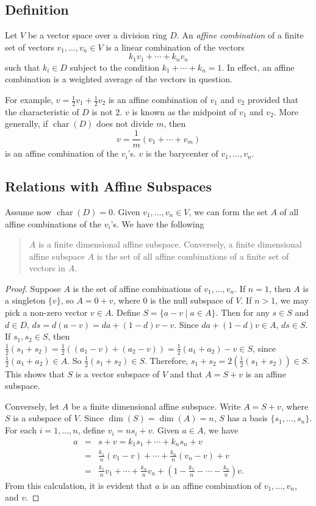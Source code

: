 \documentclass[12pt]{article}
\begin{document}
\subsection*{Definition}
Let $V$ be a vector space over a division ring $D$.  An \emph{affine combination} of a finite set of vectors $v_1,\ldots,v_n\in V$ is a linear combination of the vectors $$k_1v_1+\cdots+k_nv_n$$ such that $k_i\in D$ subject to the condition $k_1+\cdots+k_n=1$.  In effect, an affine combination is a weighted average of the vectors in question.

For example, $v=\frac{1}{2}v_1+\frac{1}{2}v_2$ is an affine combination of $v_1$ and $v_2$ provided that the characteristic of $D$ is not $2$.  $v$ is known as the midpoint of $v_1$ and $v_2$.  More generally, if $\operatorname{char}(D)$ does not divide  $m$, then $$v=\frac{1}{m}(v_1+\cdots+v_m)$$
is an affine combination of the $v_i$'s.  $v$ is the barycenter of $v_1,\ldots,v_n$.

\subsection*{Relations with Affine Subspaces}
Assume now $\operatorname{char}(D)=0$.  Given $v_1,\ldots,v_n\in V$, we can form the set $A$ of all affine combinations of the $v_i$'s.  We have the following
\begin{quote}
$A$ is a finite dimensional affine subspace.  Conversely, a finite dimensional affine subspace $A$ is the set of all affine combinations of a finite set of vectors in $A$.
\end{quote} 

\begin{proof}
Suppose $A$ is the set of affine combinations of $v_1,\ldots,v_n$.  If $n=1$, then $A$ is a singleton $\lbrace v\rbrace$, so $A=0+v$, where 0 is the null subspace of $V$.  If $n>1$, we may pick a non-zero vector $v\in A$.  Define $S=\lbrace a-v\mid a\in A\rbrace$.  Then for any $s\in S$ and $d\in D$, $ds=d(a-v)=da+(1-d)v-v$.  Since $da+(1-d)v\in A$, $ds\in S$.  If $s_1,s_2\in S$, then $\frac{1}{2}(s_1+s_2)=\frac{1}{2}((a_1-v)+(a_2-v))=\frac{1}{2} (a_1+a_2)-v\in S$, since $\frac{1}{2}(a_1+a_2)\in A$.  So $\frac{1}{2}(s_1+s_2)\in S$.  Therefore, $s_1+s_2= 2(\frac{1}{2}(s_1+s_2))\in S$.  This shows that $S$ is a vector subspace of $V$ and that $A=S+v$ is an affine subspace.

Conversely, let $A$ be a finite dimensional affine subspace.  Write $A=S+v$, where $S$ is a subspace of $V$.  Since $\operatorname{dim}(S)= \operatorname{dim}(A)=n$, $S$ has a basis $\lbrace s_1,\ldots,s_n\rbrace$.  For 
each $i=1,\ldots, n$, define $v_i=ns_i+v$.  Given $a\in A$, we have 
\begin{eqnarray*}
a &=& s+v=k_1s_1+\cdots+k_ns_n+v \\ 
&=& \frac{k_1}{n}(v_1-v)+\cdots+\frac{k_n}{n}(v_n-v)+v \\ 
&=& \frac{k_1}{n}v_1+\cdots+\frac{k_n}{n}v_n+(1-\frac{k_1}{n}-\cdots- \frac{k_n}{n})v.
\end{eqnarray*}
From this calculation, it is evident that $a$ is an affine combination of $v_1,\ldots,v_n$, and $v$.
\end{proof}
\end{document}
